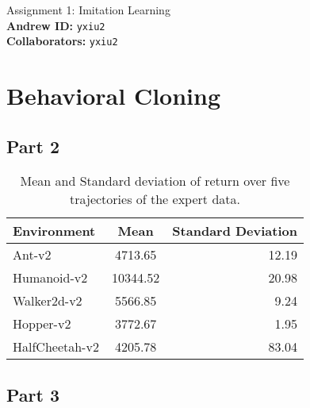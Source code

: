 \documentclass{article}
\begin{document}

\begin{centering}
    {\Large Assignment 1: Imitation Learning} \\
    \vspace{.25cm}
    \textbf{Andrew ID:} \texttt{yxiu2} \\
    \textbf{Collaborators:} \texttt{yxiu2}\\ 
\end{centering}

\vspace{.5cm}

\section{Behavioral Cloning}
\subsection{Part 2}

\begin{table}[h]
\centering
\begin{tabular}{|l|c|r|} %
\hline
Environment & Mean & Standard Deviation \\
\hline
Ant-v2 & 4713.65 & 12.19 \\
Humanoid-v2 & 10344.52 & 20.98 \\
Walker2d-v2 & 5566.85 & 9.24 \\
Hopper-v2  & 3772.67 & 1.95 \\
HalfCheetah-v2 & 4205.78 & 83.04 \\
\hline
\end{tabular}
\caption{Mean and Standard deviation of return over five trajectories of the expert data.}
\label{tab:part1}
\end{table}

\subsection{Part 3}
\end{document}
